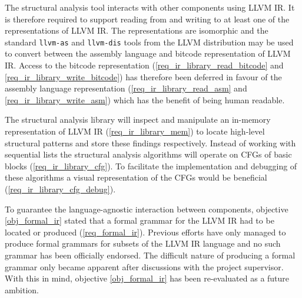 \documentclass[12pt, a4paper]{article}
\begin{document}
The structural analysis tool interacts with other components using LLVM IR. It is therefore required to support reading from and writing to at least one of the representations of LLVM IR. The representations are isomorphic and the standard \texttt{llvm-as} and \texttt{llvm-dis} tools from the LLVM distribution may be used to convert between the assembly language and bitcode representation of LLVM IR. Access to the bitcode representation (\ref{req_ir_library_read_bitcode} and \ref{req_ir_library_write_bitcode}) has therefore been deferred in favour of the assembly language representation (\ref{req_ir_library_read_asm} and \ref{req_ir_library_write_asm}) which has the benefit of being human readable.

The structural analysis library will inspect and manipulate an in-memory representation of LLVM IR (\ref{req_ir_library_mem}) to locate high-level structural patterns and store these findings respectively. Instead of working with sequential lists the structural analysis algorithms will operate on CFGs of basic blocks (\ref{req_ir_library_cfg}). To facilitate the implementation and debugging of these algorithms a visual representation of the CFGs would be beneficial (\ref{req_ir_library_cfg_debug}).

To guarantee the language-agnostic interaction between components, objective \ref{obj_formal_ir} stated that a formal grammar for the LLVM IR had to be located or produced (\ref{req_formal_ir}). Previous efforts have only managed to produce formal grammars for subsets of the LLVM IR language \cite{formal_llvm_ir_spec,formalizing_llvm_ir} and no such grammar has been officially endorsed. The difficult nature of producing a formal grammar only became apparent after discussions with the project supervisor. With this in mind, objective \ref{obj_formal_ir} has been re-evaluated as a future ambition.
\end{document}
